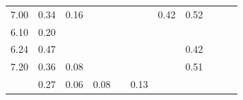 \begin{refsection}[referencesCh3]
\begin{table}
\begin{adjustbox}{scale=0.65,center}
\begin{tabular}{@{}ccccccccccc@{}}
		7.00                                                         & 0.34                                                & 0.16                                                &                                                     &                                                     &                                                      & 0.42                                                & 0.52                                                  &                                                         &                                                      & \cite{Bolzonella}                            \\
		6.10                                                         & 0.20                                                &                                                     &                                                     &                                                     &                                                      &                                                     &                                                       &                                                         &                                                      & \cite{Gell}                                \\
		6.24                                                         & 0.47                                                &                                                     &                                                     &                                                     &                                                      &                                                     & 0.42                                                  &                                                         &                                                      & \cite{Moset}                                \\
		7.20                                                         & 0.36                                                & 0.08                                                &                                                     &                                                     &                                                      &                                                     & 0.51                                                  &                                                         &                                                      & \cite{Ledda}                                \\
		& 0.27                                                & 0.06                                                & 0.08                                                &                                                     & 0.13                                                 &                                                     &                                                       &                                                         &                                                      & \cite{Kirchmann} \\

\end{tabular}
\end{adjustbox}
\end{table}
\end{refsection}
